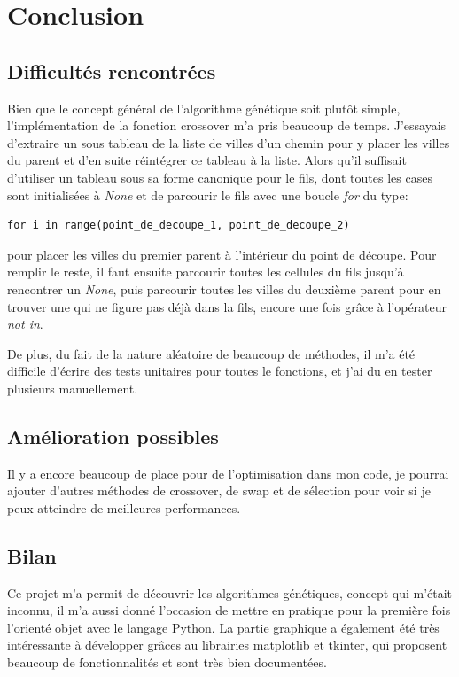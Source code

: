 \documentclass[12pt]{article}
\begin{document}
\section{Conclusion}

\subsection{Difficultés rencontrées}
Bien que le concept général de l'algorithme génétique soit plutôt simple, l'implémentation de la fonction crossover m'a pris beaucoup
de temps. J'essayais d'extraire un sous tableau de la liste de villes d'un chemin pour y placer les villes du parent et d'en suite réintégrer
ce tableau à la liste. Alors qu'il suffisait d'utiliser un tableau sous sa forme canonique pour le fils, dont toutes les cases sont initialisées à
\emph{None} et de parcourir le fils avec une boucle \emph{for} du type:
\begin{verbatim}
for i in range(point_de_decoupe_1, point_de_decoupe_2)
\end{verbatim}
pour placer les villes du premier parent à l'intérieur du point de découpe. Pour remplir le reste, il faut ensuite parcourir toutes les cellules du fils
jusqu'à rencontrer un \emph{None}, puis parcourir toutes les villes du deuxième parent pour en trouver une qui ne figure pas déjà dans la fils, encore
une fois grâce à l'opérateur \emph{not in}.

De plus, du fait de la nature aléatoire de beaucoup de méthodes, il m'a été difficile d'écrire des tests unitaires pour toutes le fonctions, et j'ai du
en tester plusieurs manuellement.

\subsection{Amélioration possibles}

Il y a encore beaucoup de place pour de l'optimisation dans mon code, je pourrai ajouter d'autres méthodes de crossover, de swap et de
sélection pour voir si je peux atteindre de meilleures performances.

\subsection{Bilan}

Ce projet m'a permit de découvrir les algorithmes génétiques, concept qui m'était inconnu, il m'a aussi donné l'occasion de mettre en pratique pour la première
fois l'orienté objet avec le langage Python. La partie graphique a également été très intéressante à développer grâces au librairies matplotlib et tkinter,
qui proposent beaucoup de fonctionnalités et sont très bien documentées.
\end{document}
